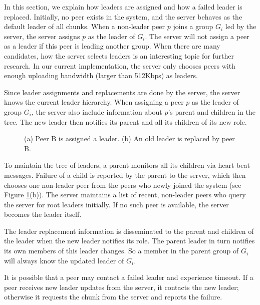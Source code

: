     In this section, we explain how leaders are assigned and
    how a failed leader is replaced.
    Initially, no peer exists in the system, and the server
    behaves as the default leader of all chunks. When a
    non-leader peer $p$ joins a group $G_i$ led by the
    server, the server assigns $p$ as the leader of $G_i$.
    The server will not assign a peer as a leader if this
    peer is leading another group.
    When there are many candidates, how the server selects leaders
    is an interesting topic for further research. In our current
    implementation, the server only chooses peers with enough
    uploading bandwidth (larger than 512Kbps) as leaders.

    Since leader assignments and replacements are done by 
    the server, the server knows the current leader hierarchy.
    When assigning a peer $p$ as the leader of group $G_i$, the
    server also include information about $p$'s parent and 
    children in the tree.  The new leader then notifies its 
    parent and all its children of its new role.   

    \begin{figure}[t]
    \centering
    \caption{(a) Peer B is assigned a leader. (b) An old leader is
    replaced by peer B. 
    \label{f:leader_assign}}
    \end{figure}

    To maintain the tree of leaders, a parent monitors all
    its children via heart beat messages.  Failure of a
    child is reported by the parent to the server, which
    then chooses one non-leader peer from the peers who
    newly joined the system (see Figure \ref{f:leader_assign}(b)).  
    The server maintains a list of recent, non-leader peers 
    who query the server for root leaders initially. 
    If no such peer is available, the server becomes the leader 
    itself.  
    
    The leader replacement information is disseminated
    to the parent and children of the leader when the new leader
    notifies its role. The parent leader in turn notifies
    its own members of this leader changes. So a member in the parent
    group of $G_i$ will always know the updated leader
    of $G_i$. 

    It is possible that a peer may contact a failed leader
    and experience timeout.  If a peer receives new leader
    updates from the server, it contacts the new leader;
    otherwise it requests the chunk from the server and 
    reports the failure.
    
